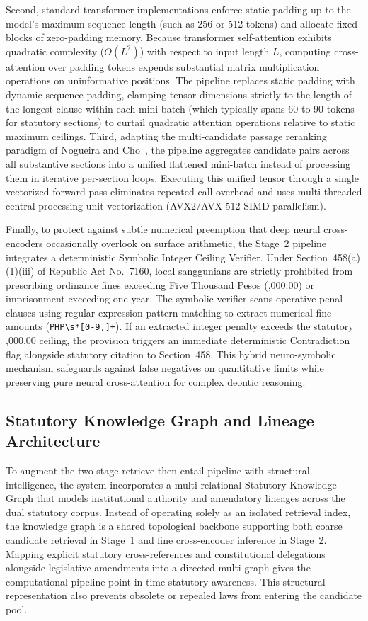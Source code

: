     Second, standard transformer implementations enforce static padding up to the model's maximum sequence length (such as 256 or 512 tokens) and allocate fixed blocks of zero-padding memory. Because transformer self-attention exhibits quadratic complexity ($O(L^2)$) with respect to input length $L$, computing cross-attention over padding tokens expends substantial matrix multiplication operations on uninformative positions. The pipeline replaces static padding with dynamic sequence padding, clamping tensor dimensions strictly to the length of the longest clause within each mini-batch (which typically spans 60 to 90 tokens for statutory sections) to curtail quadratic attention operations relative to static maximum ceilings. Third, adapting the multi-candidate passage reranking paradigm of Nogueira and Cho~\cite{nogueira2020passage}, the pipeline aggregates candidate pairs across all substantive sections into a unified flattened mini-batch instead of processing them in iterative per-section loops. Executing this unified tensor through a single vectorized forward pass eliminates repeated call overhead and uses multi-threaded central processing unit vectorization (AVX2/AVX-512 SIMD parallelism).

    Finally, to protect against subtle numerical preemption that deep neural cross-encoders occasionally overlook on surface arithmetic, the Stage~2 pipeline integrates a deterministic Symbolic Integer Ceiling Verifier. Under Section~458(a)(1)(iii) of Republic Act No.~7160, local sanggunians are strictly prohibited from prescribing ordinance fines exceeding Five Thousand Pesos (,000.00) or imprisonment exceeding one year. The symbolic verifier scans operative penal clauses using regular expression pattern matching to extract numerical fine amounts (\texttt{PHP\textbackslash s*[0-9,]+}). If an extracted integer penalty exceeds the statutory ,000.00 ceiling, the provision triggers an immediate deterministic Contradiction flag alongside statutory citation to Section~458. This hybrid neuro-symbolic mechanism safeguards against false negatives on quantitative limits while preserving pure neural cross-attention for complex deontic reasoning.

    \subsection{Statutory Knowledge Graph and Lineage Architecture}
    \label{sec:statutory_knowledge_graph_architecture}
    To augment the two-stage retrieve-then-entail pipeline with structural intelligence, the system incorporates a multi-relational Statutory Knowledge Graph that models institutional authority and amendatory lineages across the dual statutory corpus. Instead of operating solely as an isolated retrieval index, the knowledge graph is a shared topological backbone supporting both coarse candidate retrieval in Stage~1 and fine cross-encoder inference in Stage~2. Mapping explicit statutory cross-references and constitutional delegations alongside legislative amendments into a directed multi-graph gives the computational pipeline point-in-time statutory awareness. This structural representation also prevents obsolete or repealed laws from entering the candidate pool.

